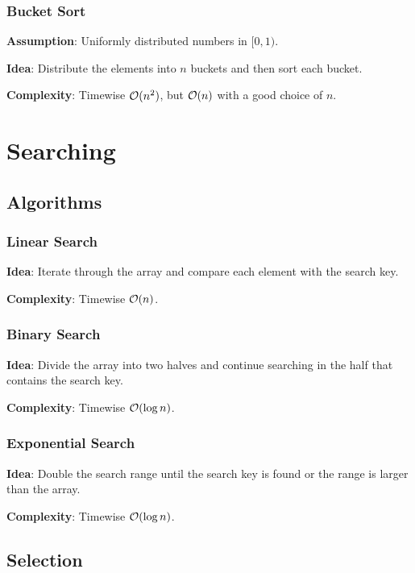 \documentclass{article}
\begin{document}
\subsubsection{Bucket Sort}
\textbf{Assumption}: Uniformly distributed numbers in $[0,1)$.\par
\textbf{Idea}: Distribute the elements into $n$ buckets and then sort each bucket.\par
\textbf{Complexity}: Timewise $\mathcal{O}(n^2)$, but $\mathcal{O}(n)$ with a good choice of $n$.\par




\section{Searching}
\subsection{Algorithms}
\subsubsection{Linear Search}
\textbf{Idea}: Iterate through the array and compare each element with the search key.\par
\textbf{Complexity}: Timewise $\mathcal{O}(n)$.\par


\subsubsection{Binary Search}
\textbf{Idea}: Divide the array into two halves and continue searching in the half that contains the search key.\par
\textbf{Complexity}: Timewise $\mathcal{O}(\log n)$.\par


\subsubsection{Exponential Search}
\textbf{Idea}: Double the search range until the search key is found or the range is larger than the array.\par
\textbf{Complexity}: Timewise $\mathcal{O}(\log n)$.\par


\subsection{Selection}
\end{document}
